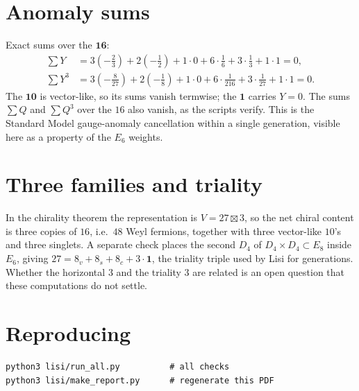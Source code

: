 \documentclass[11pt]{article}
\begin{document}
\section{Anomaly sums}
Exact sums over the $\mathbf{16}$:
\begin{align*}
  \sum Y &= 3 \left(- \frac{2}{3}\right) + 2 \left(- \frac{1}{2}\right) + 1 \cdot 0 + 6 \cdot \frac{1}{6} + 3 \cdot \frac{1}{3} + 1 \cdot 1 = 0,\\
  \sum Y^3 &= 3 \left(- \frac{8}{27}\right) + 2 \left(- \frac{1}{8}\right) + 1 \cdot 0 + 6 \cdot \frac{1}{216} + 3 \cdot \frac{1}{27} + 1 \cdot 1 = 0 .
\end{align*}
The $\mathbf{10}$ is vector-like, so its sums vanish termwise; the $\mathbf{1}$
carries $Y=0$.  The sums $\sum Q$ and $\sum Q^3$ over the $16$ also vanish, as
the scripts verify.  This is the Standard Model gauge-anomaly cancellation
within a single generation, visible here as a property of the $E_6$ weights.

\section{Three families and triality}
In the chirality theorem the representation is $V=27\boxtimes 3$, so the net
chiral content is three copies of $16$, i.e.\ $48$ Weyl fermions, together with
three vector-like $10$'s and three singlets.  A separate check places the second
$D_4$ of $D_4\times D_4\subset E_8$ inside $E_6$, giving
$27=8_v+8_s+8_c+3\cdot\mathbf 1$, the triality triple used by Lisi for
generations.  Whether the horizontal $3$ and the triality $3$ are related is an
open question that these computations do not settle.

\section{Reproducing}
\begin{verbatim}
python3 lisi/run_all.py          # all checks
python3 lisi/make_report.py      # regenerate this PDF
\end{verbatim}
\end{document}
